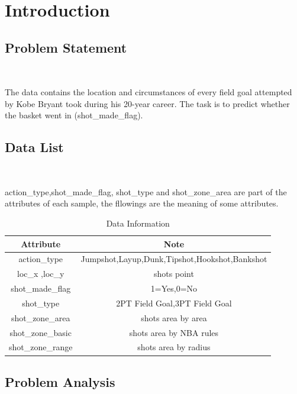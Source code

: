 
\section{Introduction}\label{sec-intro}

\subsection{Problem Statement}
\

The data contains the location and circumstances of every field goal 
attempted by Kobe Bryant took during his 20-year career. The task is to predict 
whether the basket went in (shot_made_flag).




\subsection{Data List}
\

\DIFdelbegin %
\DIFdelend \DIFaddbegin {}\DIFaddend action_type,shot_made_flag,  
shot_type and shot_zone_area are part of the attributes of each sample,
the fllowings are the meaning of some attributes.

\begin{table}[htbp]
	\centering
	\begin{tabular}{cc}
		\toprule  %
		Attribute& Note\\
		\hline
		action_type & Jumpshot,Layup,Dunk,Tipshot,Hookshot,Bankshot\\
		loc_x ,loc_y & shots point\\
		shot_made_flag & 1=Yes,0=No\\
		shot_type & 2PT Field Goal,3PT Field Goal\\
		shot_zone_area & shots area by area\\
		shot_zone_basic & shots area by  NBA rules\\
		shot_zone_range & shots area by radius\\

		\bottomrule %
	\end{tabular}
	\bigskip
	\caption{Data Information}
\end{table}
\label{table1}



\subsection{Problem Analysis}

